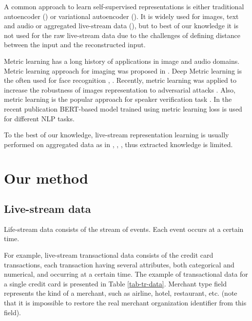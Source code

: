 \documentclass[sigconf]{acmart}
\begin{document}
A common approach to learn self-supervised representations is either traditional autoencoder (\cite{rumelhart1985learning}) or variational autoencoder (\cite{kingma2013auto}). It is widely used for images, text and audio or aggregated live-stream data (\cite{mancisidor2019learning}), but to best of our knowledge it is not used for the raw live-stream data due to the challenges of defining distance between the input and the reconstructed input.

Metric learning has a long history of applications in image and audio domains. Metric learning approach for imaging was proposed in \cite{Hadsell:2006:DRL:1153171.1153654}. 
Deep Metric learning is the often used for face recognition \cite{Schroff2015FaceNetAU}, \cite{kaya2019deep}. Recently, metric learning was applied to increase the robustness of images representation to adversarial attacks \cite{Mao2019AdvRobust}. Also, metric learning is the popular approach for speaker verification task \cite{wan2017generalized}.
In the recent publication \cite{reimers-2019-sentence-bert} BERT-based model \cite{Devlin2019BERTPO} trained using metric learning loss is used for different NLP tasks.

To the best of our knowledge, live-stream representation learning is usually performed on aggregated data as in \cite{baldassini2018client2vec}, \cite{mancisidor2019learning}, \cite{doan2019generating}, thus extracted knowledge is limited.  

\section{Our method} \label{sec-method}

\subsection{Live-stream data}

Life-stream data consists of the stream of events. Each event occurs at a certain time.

For example, live-stream transactional data consists of the credit card transactions, each transaction having several attributes, both categorical and numerical, and occurring at a certain time. The example of transactional data for a single credit card is presented in Table \ref{tab-tr-data}.
Merchant type field represents the kind of a merchant, such as airline, hotel, restaurant, etc. (note that it is impossible to restore the real merchant organization identifier from this field).
\end{document}
